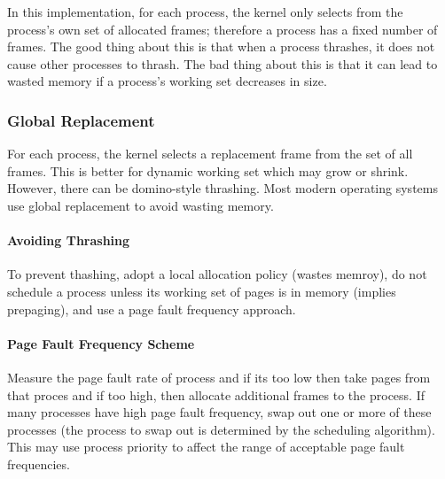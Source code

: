\documentclass{article}
\begin{document}
In this implementation, for each process, the kernel only selects from the process's own set of allocated frames; therefore a process has a fixed number of frames. The good thing about this is that when a process thrashes, it does not cause other processes to thrash. The bad thing about this is that it can lead to wasted memory if a process's working set decreases in size. 

\subsubsection{Global Replacement}

For each process, the kernel selects a replacement frame from the set of all frames. This is better for dynamic working set which may grow or shrink. However, there can be domino-style thrashing. Most modern operating systems use global replacement to avoid wasting memory. 

\paragraph{Avoiding Thrashing}

To prevent thashing, adopt a local allocation policy (wastes memroy), do not schedule a process unless its working set of pages is in memory (implies prepaging), and use a page fault frequency approach. 

\paragraph{Page Fault Frequency Scheme}

Measure the page fault rate of process and if its too low then take pages from that proces and if too high, then allocate additional frames to the process. If many processes have high page fault frequency, swap out one or more of these processes (the process to swap out is determined by the scheduling algorithm). This may use process priority to affect the range of acceptable page fault frequencies. 
\end{document}
